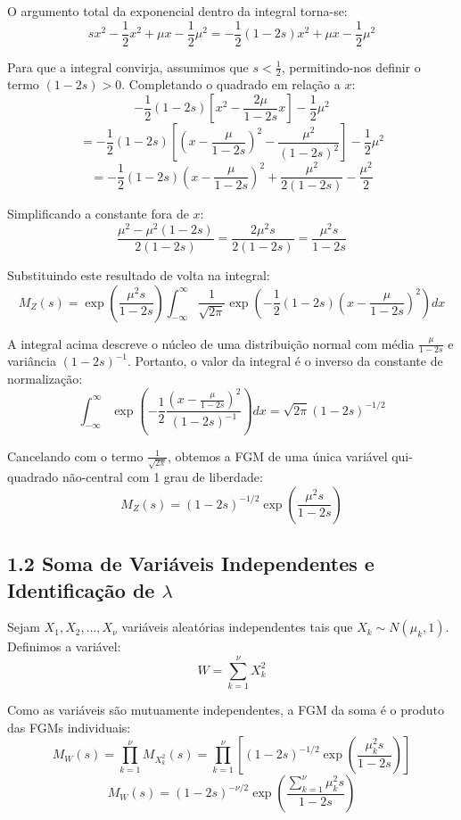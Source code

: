 \documentclass[
]{article}
\begin{document}
O argumento total da exponencial dentro da integral torna-se:
\[sx^2 - \frac{1}{2}x^2 + \mu x - \frac{1}{2}\mu^2 = -\frac{1}{2}(1 - 2s)x^2 + \mu x - \frac{1}{2}\mu^2\]

Para que a integral convirja, assumimos que \(s < \frac{1}{2}\),
permitindo-nos definir o termo \((1-2s) > 0\). Completando o quadrado em
relação a \(x\):
\[-\frac{1}{2}(1 - 2s)\left[ x^2 - \frac{2\mu}{1 - 2s}x \right] - \frac{1}{2}\mu^2\]
\[= -\frac{1}{2}(1 - 2s)\left[ \left( x - \frac{\mu}{1 - 2s} \right)^2 - \frac{\mu^2}{(1 - 2s)^2} \right] - \frac{1}{2}\mu^2\]
\[= -\frac{1}{2}(1 - 2s)\left( x - \frac{\mu}{1 - 2s} \right)^2 + \frac{\mu^2}{2(1 - 2s)} - \frac{\mu^2}{2}\]

Simplificando a constante fora de \(x\):
\[\frac{\mu^2 - \mu^2(1 - 2s)}{2(1 - 2s)} = \frac{2\mu^2 s}{2(1 - 2s)} = \frac{\mu^2 s}{1 - 2s}\]

Substituindo este resultado de volta na integral:
\[M_Z(s) = \exp\left( \frac{\mu^2 s}{1 - 2s} \right) \int_{-\infty}^{\infty} \frac{1}{\sqrt{2\pi}} \exp\left( -\frac{1}{2}(1 - 2s)\left( x - \frac{\mu}{1 - 2s} \right)^2 \right) dx\]

A integral acima descreve o núcleo de uma distribuição normal com média
\(\frac{\mu}{1 - 2s}\) e variância \((1 - 2s)^{-1}\). Portanto, o valor
da integral é o inverso da constante de normalização:
\[\int_{-\infty}^{\infty} \exp\left( -\frac{1}{2}\frac{\left( x - \frac{\mu}{1 - 2s} \right)^2}{(1 - 2s)^{-1}} \right) dx = \sqrt{2\pi} (1 - 2s)^{-1/2}\]

Cancelando com o termo \(\frac{1}{\sqrt{2\pi}}\), obtemos a FGM de uma
única variável qui-quadrado não-central com 1 grau de liberdade:
\[M_Z(s) = (1 - 2s)^{-1/2} \exp\left( \frac{\mu^2 s}{1 - 2s} \right)\]

\subsection{\texorpdfstring{1.2 Soma de Variáveis Independentes e
Identificação de
\(\lambda\)}{1.2 Soma de Variáveis Independentes e Identificação de \textbackslash lambda}}\label{soma-de-variuxe1veis-independentes-e-identificauxe7uxe3o-de-lambda}

Sejam \(X_1, X_2, \dots, X_\nu\) variáveis aleatórias independentes tais
que \(X_k \sim N(\mu_k, 1)\). Definimos a variável:
\[W = \sum_{k=1}^{\nu} X_k^2\]

Como as variáveis são mutuamente independentes, a FGM da soma é o
produto das FGMs individuais:
\[M_W(s) = \prod_{k=1}^{\nu} M_{X_k^2}(s) = \prod_{k=1}^{\nu} \left[ (1 - 2s)^{-1/2} \exp\left( \frac{\mu_k^2 s}{1 - 2s} \right) \right]\]
\[M_W(s) = (1 - 2s)^{-\nu/2} \exp\left( \frac{\sum_{k=1}^{\nu} \mu_k^2 s}{1 - 2s} \right)\]
\end{document}
